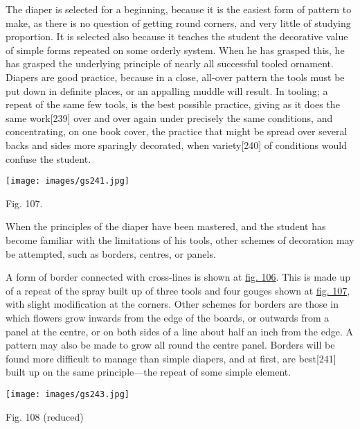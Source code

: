 \documentclass[
]{article}
\begin{document}
The diaper is selected for a beginning, because it is the easiest form
of pattern to make, as there is no question of getting round corners,
and very little of studying proportion. It is selected also because it
teaches the student the decorative value of simple forms repeated on
some orderly system. When he has grasped this, he has grasped the
underlying principle of nearly all successful tooled ornament. Diapers
are good practice, because in a close, all-over pattern the tools must
be put down in definite places, or an appalling muddle will result. In
tooling; a repeat of the same few tools, is the best possible practice,
giving as it does the same
work{\protect\hypertarget{Page_239}{}{{[}239{]}}} over and over again
under precisely the same conditions, and concentrating, on one book
cover, the practice that might be spread over several backs and sides
more sparingly decorated, when
variety{\protect\hypertarget{Page_240}{}{{[}240{]}}} of conditions would
confuse the student.

\protect\hypertarget{Fig_107}{}{}
\texttt{[image: images/gs241.jpg]}

Fig. 107.

When the principles of the diaper have been mastered, and the student
has become familiar with the limitations of his tools, other schemes of
decoration may be attempted, such as borders, centres, or panels.

A form of border connected with cross-lines is shown at
\protect\hyperlink{Fig_106}{fig. 106}. This is made up of a repeat of
the spray built up of three tools and four gouges shown at
\protect\hyperlink{Fig_107}{fig. 107}, with slight modification at the
corners. Other schemes for borders are those in which flowers grow
inwards from the edge of the boards, or outwards from a panel at the
centre, or on both sides of a line about half an inch from the edge. A
pattern may also be made to grow all round the centre panel. Borders
will be found more difficult to manage than simple diapers, and at
first, are best{\protect\hypertarget{Page_241}{}{{[}241{]}}} built up on
the same principle---the repeat of some simple element.

\protect\hypertarget{Fig_108}{}{}
\texttt{[image: images/gs243.jpg]}

Fig. 108 (reduced)
\end{document}
